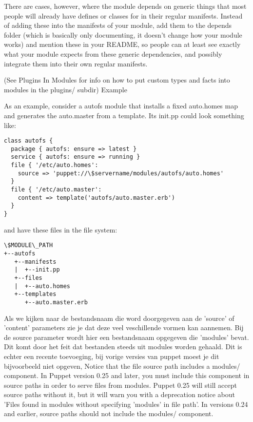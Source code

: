 There are cases, however, where the module depends on generic things that most people will already have defines or classes for in their regular manifests. Instead of adding these into the manifests of your module, add them to the depends folder (which is basically only documenting, it doesn't change how your module works) and mention these in your README, so people can at least see exactly what your module expects from these generic dependencies, and possibly integrate them into their own regular manifests.

(See Plugins In Modules for info on how to put custom types and facts into modules in the plugins/ subdir)
Example

As an example, consider a autofs module that installs a fixed auto.homes map and generates the auto.master from a template. Its init.pp could look something like:
%
\begin{code}
\begin{lstlisting}
class autofs {
  package { autofs: ensure => latest }
  service { autofs: ensure => running }
  file { '/etc/auto.homes':
    source => 'puppet://\$servername/modules/autofs/auto.homes'
  }
  file { '/etc/auto.master':
    content => template('autofs/auto.master.erb')
  }
}
\end{lstlisting}
\end{code}
%
and have these files in the file system:
%
\begin{code}
\begin{lstlisting}
\$MODULE\_PATH
+--autofs
   +--manifests
   |  +--init.pp
   +--files
   |  +--auto.homes
   +--templates
      +--auto.master.erb
\end{lstlisting}
\end{code}

Als we kijken naar de bestandsnaam die word doorgegeven aan de 'source' of 'content' parameters zie je dat deze veel veschillende vormen kan aannemen. Bij de source parameter wordt hier een bestandsnaam opgegeven die 'modules' bevat. Dit komt door het feit dat bestanden steeds uit modules worden gehaald. Dit is echter een recente toevoeging, bij vorige versies van puppet moest je dit bijvoorbeeld niet opgeven,
Notice that the file source path includes a modules/ component. In Puppet version 0.25 and later, you must include this component in source paths in order to serve files from modules. Puppet 0.25 will still accept source paths without it, but it will warn you with a deprecation notice about 'Files found in modules without specifying 'modules' in file path'. In versions 0.24 and earlier, source paths should not include the modules/ component.

